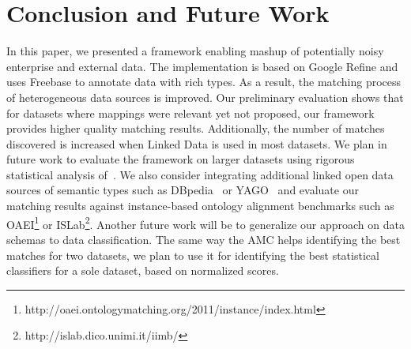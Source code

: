 \documentclass{../../Util/LaTEX/sig-alternate}
\begin{document}

\section{Conclusion and Future Work}

In this paper, we presented a framework enabling mashup of potentially noisy enterprise and external data. The implementation is based on Google Refine and uses Freebase to annotate data with rich types. As a result, the matching process of heterogeneous data sources is improved. Our preliminary evaluation shows that for datasets where mappings were relevant yet not proposed, our framework provides higher quality matching results. Additionally, the number of matches discovered is increased when Linked Data is used in most datasets. We plan in future work to evaluate the framework on larger datasets using rigorous statistical analysis of~\cite{Fawcett}. We also consider integrating additional linked open data sources of semantic types such as DBpedia~\cite{Auer07dbpedia:a} or YAGO~\cite{Suchanek:2007:YCS:1242572.1242667} and evaluate our matching results against instance-based ontology alignment benchmarks such as OAEI\footnote{http://oaei.ontologymatching.org/2011/instance/index.html} or ISLab\footnote{http://islab.dico.unimi.it/iimb/}. Another future work will be to generalize our approach on data schemas to data classification. The same way the AMC helps identifying the best matches for two datasets, we plan to use it for identifying the best statistical classifiers for a sole dataset, based on normalized scores.

\nocite{*}


\end{document}
